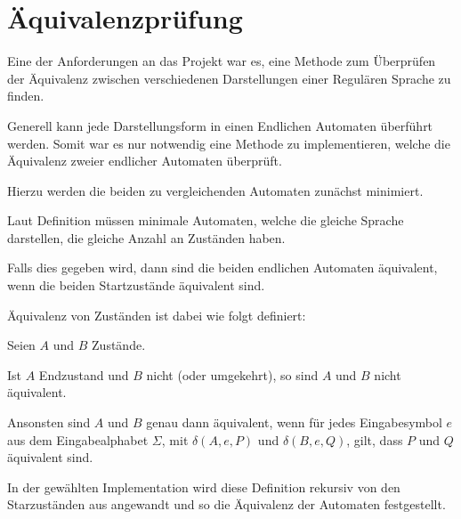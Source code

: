 \section{Äquivalenzprüfung}

Eine der Anforderungen an das Projekt war es, eine Methode zum Überprüfen der Äquivalenz 
zwischen verschiedenen Darstellungen einer Regulären Sprache zu finden.

Generell kann jede Darstellungsform in einen Endlichen Automaten überführt werden. Somit
war es nur notwendig eine Methode zu implementieren, welche die Äquivalenz zweier endlicher
Automaten überprüft.

Hierzu werden die beiden zu vergleichenden Automaten zunächst minimiert.

Laut Definition müssen minimale Automaten, welche die gleiche Sprache darstellen, die
gleiche Anzahl an Zuständen haben.

Falls dies gegeben wird, dann sind die beiden endlichen Automaten äquivalent, wenn die
beiden Startzustände äquivalent sind.

Äquivalenz von Zuständen ist dabei wie folgt definiert:

Seien $A$ und $B$ Zustände. 

Ist $A$ Endzustand und $B$ nicht (oder umgekehrt), so sind $A$ und $B$ nicht äquivalent.

Ansonsten sind $A$ und $B$ genau dann äquivalent, wenn für jedes
Eingabesymbol $e$ aus dem Eingabealphabet $\Sigma$, mit $\delta(A,e,P)$ und $\delta(B,e,Q)$,
gilt, dass $P$ und $Q$ äquivalent sind.
 
In der gewählten Implementation wird diese Definition rekursiv von den Starzuständen aus
angewandt und so die Äquivalenz der Automaten festgestellt.